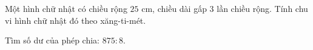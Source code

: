 \begin{ex} %
Một hình chữ nhật có chiều rộng $25\text{ cm}$, chiều dài gấp 3 lần chiều rộng. Tính chu vi hình chữ nhật đó theo xăng-ti-mét.
\end{ex}

\begin{ex} %
Tìm số dư của phép chia: $875 : 8$.
\end{ex}
